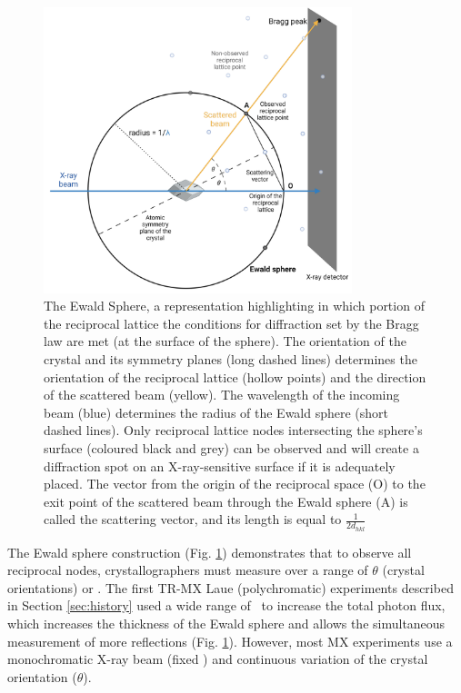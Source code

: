 \begin{figure}[H] %
    \centering
    \noindent \includegraphics[width=0.8\textwidth]{images/Introduction/Ewald_sphere.pdf}
    \hfill
    \caption{The Ewald Sphere, a representation highlighting in which portion of the reciprocal lattice the conditions for diffraction set by the Bragg law are met (at the surface of the sphere). The orientation of the crystal and its symmetry planes (long dashed lines) determines the orientation of the reciprocal lattice (hollow points) and the direction of the scattered beam (yellow). The wavelength of the incoming beam (blue) determines the radius of the Ewald sphere (short dashed lines). Only reciprocal lattice nodes intersecting the sphere's surface (coloured black and grey) can be observed and will create a diffraction spot on an X-ray-sensitive surface if it is adequately placed. The vector from the origin of the reciprocal space (O) to the exit point of the scattered beam through the Ewald sphere (A) is called the scattering vector, and its length is equal to \(\frac{1}{2d_{hkl}}\)} \label{fig:Ewald}
\end{figure}

The Ewald sphere construction (Fig. \ref{fig:Ewald}) demonstrates that to observe all reciprocal nodes, crystallographers must measure over a range of \(\theta\) (crystal orientations) or \textlambda. The first TR-MX Laue (polychromatic) experiments described in Section \ref{sec:history} used a wide range of \textlambda\ to increase the total photon flux, which increases the thickness of the Ewald sphere and allows the simultaneous measurement of more reflections (Fig. \ref{fig:Ewald}). However, most MX experiments use a monochromatic X-ray beam (fixed \textlambda) and continuous variation of the crystal orientation (\(\theta\)). %

